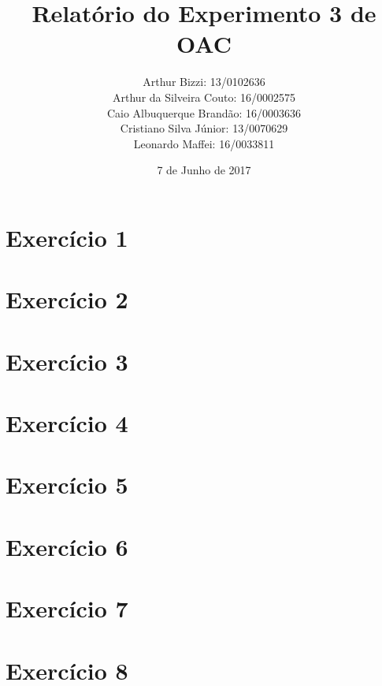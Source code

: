 \documentclass[12pt, a4paper, twoside]{article}
\begin{document}
\title{Relatório do Experimento 3 de OAC}
\author{
Arthur Bizzi: 13/0102636 \\
Arthur da Silveira Couto: 16/0002575 \\
Caio Albuquerque Brandão: 16/0003636 \\
Cristiano Silva Júnior: 13/0070629 \\
Leonardo Maffei: 16/0033811 \\}
\date{7 de Junho de 2017}
\maketitle

\section{Exercício 1}


\section{Exercício 2}


\section{Exercício 3}


\section{Exercício 4}


\section{Exercício 5}


\section{Exercício 6}


\section{Exercício 7}


\section{Exercício 8}

\end{document}
